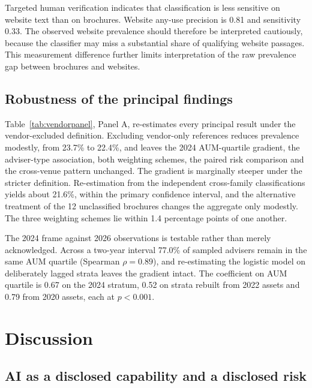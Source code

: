 \documentclass[utf8]{FrontiersinHarvard}
\begin{document}
Targeted human verification indicates that classification is less sensitive on website text than on brochures. Website any-use precision is 0.81 and sensitivity 0.33. The observed website prevalence should therefore be interpreted cautiously, because the classifier may miss a substantial share of qualifying website passages. This measurement difference further limits interpretation of the raw prevalence gap between brochures and websites.

\subsection{Robustness of the principal findings}

Table~\ref{tab:vendorpanel}, Panel A, re-estimates every principal result under the vendor-excluded definition. Excluding vendor-only references reduces prevalence modestly, from 23.7\% to 22.4\%, and leaves the 2024 AUM-quartile gradient, the adviser-type association, both weighting schemes, the paired risk comparison and the cross-venue pattern unchanged. The gradient is marginally steeper under the stricter definition. Re-estimation from the independent cross-family classifications yields about 21.6\%, within the primary confidence interval, and the alternative treatment of the 12 unclassified brochures changes the aggregate only modestly. The three weighting schemes lie within 1.4 percentage points of one another.

The 2024 frame against 2026 observations is testable rather than merely acknowledged. Across a two-year interval 77.0\% of sampled advisers remain in the same AUM quartile (Spearman $\rho = 0.89$), and re-estimating the logistic model on deliberately lagged strata leaves the gradient intact. The coefficient on AUM quartile is 0.67 on the 2024 stratum, 0.52 on strata rebuilt from 2022 assets and 0.79 from 2020 assets, each at $p < 0.001$.

\section{Discussion}

\subsection{AI as a disclosed capability and a disclosed risk}
\end{document}
